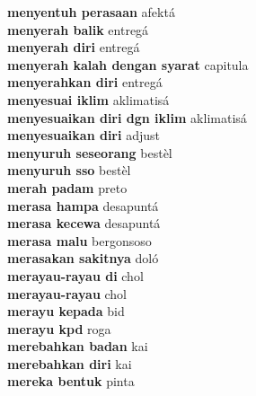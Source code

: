 \textbf{ menyentuh perasaan  } afektá \\
\textbf{ menyerah balik  } entregá \\
\textbf{ menyerah diri  } entregá \\
\textbf{ menyerah kalah dengan syarat  } capitula \\
\textbf{ menyerahkan diri  } entregá \\
\textbf{ menyesuai iklim  } aklimatisá \\
\textbf{ menyesuaikan diri dgn iklim  } aklimatisá \\
\textbf{ menyesuaikan diri  } adjust \\
\textbf{ menyuruh seseorang  } bestèl \\
\textbf{ menyuruh sso  } bestèl \\
\textbf{ merah padam  } preto \\
\textbf{ merasa hampa  } desapuntá \\
\textbf{ merasa kecewa  } desapuntá \\
\textbf{ merasa malu  } bergonsoso \\
\textbf{ merasakan sakitnya  } doló \\
\textbf{ merayau-rayau di  } chol \\
\textbf{ merayau-rayau  } chol \\
\textbf{ merayu kepada  } bid \\
\textbf{ merayu kpd  } roga \\
\textbf{ merebahkan badan  } kai \\
\textbf{ merebahkan diri  } kai \\
\textbf{ mereka bentuk  } pinta \\
